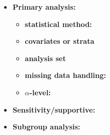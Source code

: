 \begin{itemize}
    \item \textbf{Primary analysis: }
    \begin{itemize}
        \item \textbf{statistical method: } %
        \item \textbf{covariates or strata} %
        \item \textbf{analysis set} %
        \item \textbf{missing data handling: } 
        \item \textbf{$\alpha$-level: } 
    \end{itemize}
    
    \item \textbf{Sensitivity/supportive: }
    \item \textbf{Subgroup analysis: } %
\end{itemize}